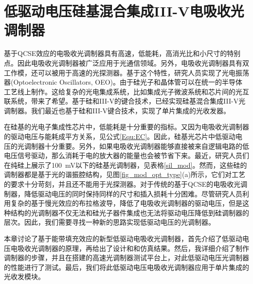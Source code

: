 \chapter{低驱动电压硅基混合集成III-V电吸收光调制器}
基于QCSE效应的电吸收光调制器具有高速，低能耗，高消光比和小尺寸的特别点\cite{tang2012energy, fukano2006very}。因此电吸收光调制器被广泛应用于光通信领域。另外，电吸收光调制器具有双工作模，还可以被用于高速的光探测器\cite{welstand1996dual}。基于这个特性，研究人员实现了光电振荡器(Optoelectronic Oscillators, OEO)\cite{zhou2014compact}。由于硅光子和晶体管可以在统一的半导体工艺线上制作。这给复杂的光电集成系统，比如集成光子微波系统\cite{Marpaung2013integrated}和芯片间的光互联系统\cite{sun2015single}，带来了希望。基于硅和III-V的键合技术，已经实现硅基混合集成III-V光调制器\cite{kuo2008high,tang201150,tang2012over,tang2012energy,chen2011forty,Srinivasan2012micro,fu20155}。我们最近也基于硅和III-V键合技术，实现了单片集成的光收发器\cite{chen2016wavelength}。

在硅基的光电子集成性芯片中，低能耗是十分重要的指标。又因为电吸收光调制器的驱动电压与能耗成平方关系，见公式\ref{Equ:EC}。因此，硅基光芯片中低驱动电压的光调制器十分重要。另外，如果电吸收光调制器能够直接被来自逻辑电路的低电压信号驱动，那么消耗于电的放大器的能量也会被节省下来。最近，研究人员们在纯硅上展示了100~mV以下的硅基光调制器，见表格\ref{sil_mod}。然而，这些硅的调制器都是基于光的谐振腔结构，见图\ref{fig_mod_opt_type}(a)所示，它们对工艺的要求十分苛刻，并且还不能用于光探测器。对于传统的基于QCSE的电吸收光调制器，降低驱动电压的同时保持同样的尺寸和插入损耗十分困难。尽管研究人员利用复杂的基于慢光效应的布拉格波导\cite{gulow-voltage2013}，降低了电吸收光调制器的驱动电压，但是这种结构的光调制器不仅无法和硅光子器件集成也无法将驱动电压降低到硅调制器的层次。因此，我们需要寻找一种新的思路实现低驱动电压的光调制器。

本章讨论了基于能带填充效应的新型低驱动电吸收光调制器，首先介绍了低驱动电压电吸收光调制器的原理，再给出了设计和和仿真结果。然后，我详细介绍了制作调制器的步骤，并且在搭建的高速光调制器测试平台上，对此低驱动电压光调制器的性能进行了测试。最后，我们将此低驱动电压电吸收光调制器应用于单片集成的光收发模块。
